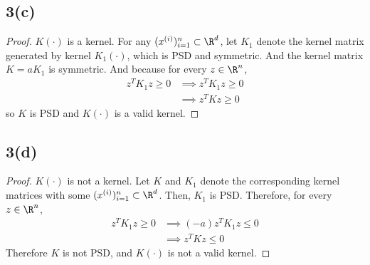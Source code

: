 \documentclass[11pt]{article}
\newcommand{\upi}[0]{^{(i)}}
\begin{document}
	\newpage
	\subsection{3(c)}
	\begin{proof}
		$K(\cdot)$ is a kernel. For any $(x\upi)_{i=1}^n \subset \R^d$, let $K_1$ denote the kernel matrix generated by kernel $K_1(\cdot)$, which is PSD and symmetric. And the kernel matrix $K = a K_1$ is symmetric. And because for every $z \in \R^n$, 
		\begin{align}
			z^T K_1 z \geq 0 &\implies z^T K_1 z \geq 0 \\
			&\implies z^T K z \geq 0
		\end{align}
		so $K$ is PSD and $K(\cdot)$ is a valid kernel.
	\end{proof}
	
	\newpage
	\subsection{3(d)}
	\begin{proof}
		$K(\cdot)$ is not a kernel. Let $K$ and $K_1$ denote the corresponding kernel matrices with some $(x\upi)_{i=1}^n \subset \R^d$. Then, $K_1$ is PSD. Therefore, for every $z \in \R^n$,
		\begin{align}
			z^T K_1 z \geq 0 &\implies (-a)z^T K_1 z \leq 0 \\
			&\implies z^T K z \leq 0
		\end{align}
		Therefore $K$ is not PSD, and $K(\cdot)$ is not a valid kernel.
	\end{proof}
	
	\newpage
\end{document}
